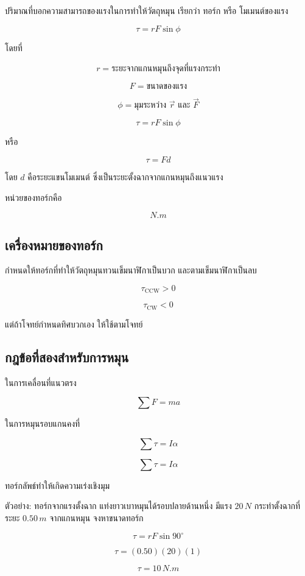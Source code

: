 ปริมาณที่บอกความสามารถของแรงในการทำให้วัตถุหมุน เรียกว่า ทอร์ก หรือ โมเมนต์ของแรง

\[
\tau=rF\sin\phi
\]

โดยที่

\[
r=\text{ระยะจากแกนหมุนถึงจุดที่แรงกระทำ}
\]

\[
F=\text{ขนาดของแรง}
\]

\[
\phi=\text{มุมระหว่าง } \vec{r} \text{ และ } \vec{F}
\]

\begin{tcolorbox}[title=ทอร์ก]
\[
\tau=rF\sin\phi
\]

หรือ

\[
\tau=F d
\]

โดย $d$ คือระยะแขนโมเมนต์ ซึ่งเป็นระยะตั้งฉากจากแกนหมุนถึงแนวแรง
\end{tcolorbox}

หน่วยของทอร์กคือ

\[
\si{N.m}
\]

\subsection{เครื่องหมายของทอร์ก}

กำหนดให้ทอร์กที่ทำให้วัตถุหมุนทวนเข็มนาฬิกาเป็นบวก และตามเข็มนาฬิกาเป็นลบ

\[
\tau_{\text{CCW}}>0
\]

\[
\tau_{\text{CW}}<0
\]

แต่ถ้าโจทย์กำหนดทิศบวกเอง ให้ใช้ตามโจทย์

\subsection{กฎข้อที่สองสำหรับการหมุน}

ในการเคลื่อนที่แนวตรง

\[
\sum F=ma
\]

ในการหมุนรอบแกนคงที่

\[
\sum \tau=I\alpha
\]

\begin{tcolorbox}[title=กฎการหมุน]
\[
\sum \tau=I\alpha
\]

ทอร์กลัพธ์ทำให้เกิดความเร่งเชิงมุม
\end{tcolorbox}

\begin{examplebox}{ตัวอย่าง: ทอร์กจากแรงตั้งฉาก}
แท่งยาวเบาหมุนได้รอบปลายด้านหนึ่ง มีแรง $20\,\si{N}$ กระทำตั้งฉากที่ระยะ $0.50\,\si{m}$ จากแกนหมุน จงหาขนาดทอร์ก

\[
\tau=rF\sin90^\circ
\]

\[
\tau=(0.50)(20)(1)
\]

\[
\boxed{\tau=10\,\si{N.m}}
\]
\end{examplebox}

